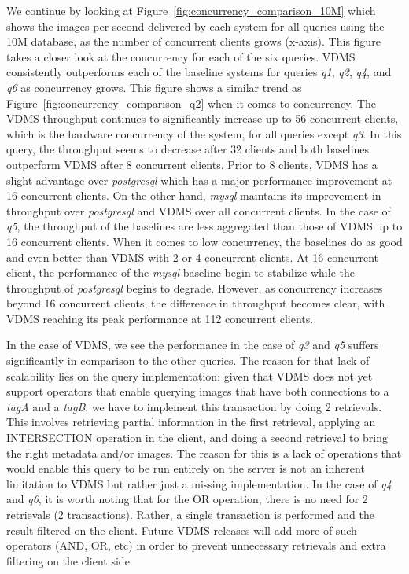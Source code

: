 We continue by looking at Figure~\ref{fig:concurrency_comparison_10M}
which shows the images per second delivered by each system
for all queries using the 10M database, as the number of concurrent
clients grows (x-axis). This figure takes a closer look at the
concurrency for each of the six queries.
VDMS consistently outperforms each of the baseline
systems for queries \textit{q1}, \textit{q2}, \textit{q4},
and \textit{q6} as concurrency grows. This figure
shows a similar trend as Figure~\ref{fig:concurrency_comparison_q2}
when it comes to concurrency.  The
VDMS throughput continues to significantly increase up to 56 concurrent clients,
which is the hardware concurrency of the system, for all queries except \textit{q3}.
In this query, the throughput seems to decrease after 32 clients
and both baselines outperform VDMS after 8 concurrent clients.
Prior to 8 clients, VDMS has a slight advantage over \textit{postgresql} which has
a major performance improvement at 16 concurrent clients. On the other hand,
\textit{mysql} maintains its improvement in throughput over \textit{postgresql}
and VDMS over all concurrent clients.
In the case of \textit{q5}, the throughput of the baselines
are less aggregated than those of VDMS up to 16 concurrent clients. When it comes
to low concurrency, the baselines do as good and even better than VDMS with 2 or
4 concurrent clients.
At 16 concurrent client, the performance of the \textit{mysql} baseline
begin to stabilize while the throughput of \textit{postgresql} begins to degrade.
However, as concurrency increases beyond 16 concurrent clients, the difference
in throughput becomes clear, with VDMS reaching its peak performance at
112 concurrent clients.

In the case of VDMS, we see the performance in the case of \textit{q3}
and \textit{q5} suffers significantly in comparison to the other queries.
The reason for that lack of scalability lies on the query implementation: given that
VDMS does not yet support operators that enable querying images
that have both connections to a \textit{tagA} and a \textit{tagB};
we have to implement this transaction by doing 2 retrievals.
This involves retrieving partial information in the first retrieval,
applying an INTERSECTION operation in the client, and doing a second retrieval
to bring the right metadata and/or images.
The reason for this is a lack of operations that would enable this query to be
run entirely on the server is not an inherent limitation to VDMS but rather
just a missing implementation.
In the case of \textit{q4} and \textit{q6}, it is worth noting
that for the OR operation, there is no need for 2 retrievals (2 transactions).
Rather, a single transaction is performed and the result filtered on the client.
Future VDMS releases will add more of such operators (AND, OR, etc)
in order to prevent unnecessary retrievals and extra filtering on the client side.

